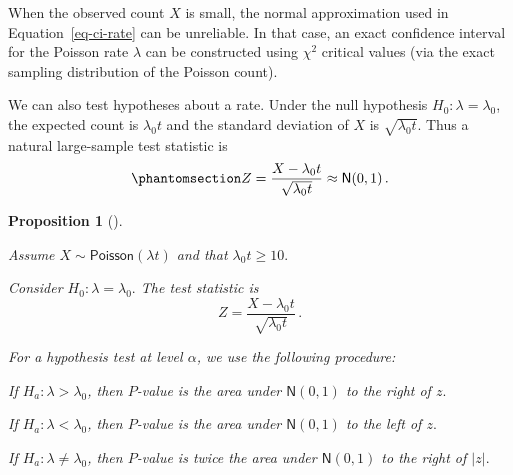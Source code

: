 \documentclass[
  a4paper,
  DIV=11,
  numbers=noendperiod,
  oneside]{scrreprt}
\theoremstyle{plain}
\theoremstyle{definition}
\theoremstyle{definition}
\theoremstyle{definition}
\theoremstyle{plain}
\newtheorem{proposition}{Proposition}[chapter]
\theoremstyle{remark}
\begin{document}
\begin{tcolorbox}[enhanced jigsaw, toprule=.15mm, colbacktitle=quarto-callout-note-color!10!white, breakable, toptitle=1mm, title=\textcolor{quarto-callout-note-color}{\faInfo}\hspace{0.5em}{Exact intervals for small counts}, left=2mm, leftrule=.75mm, colback=white, colframe=quarto-callout-note-color-frame, coltitle=black, opacitybacktitle=0.6, rightrule=.15mm, titlerule=0mm, bottomrule=.15mm, bottomtitle=1mm, arc=.35mm, opacityback=0]

When the observed count \(X\) is small, the normal approximation used in
Equation~\ref{eq-ci-rate} can be unreliable. In that case, an exact
confidence interval for the Poisson rate \(\lambda\) can be constructed
using \(\chi^2\) critical values (via the exact sampling distribution of
the Poisson count).

\end{tcolorbox}

We can also test hypotheses about a rate. Under the null hypothesis
\(H_0:\lambda=\lambda_0\), the expected count is \(\lambda_0 t\) and the
standard deviation of \(X\) is \(\sqrt{\lambda_0 t}\). Thus a natural
large-sample test statistic is
\begin{equation}\phantomsection\label{eq-htest-rate-z}{
Z = \frac{X - \lambda_0 t}{\sqrt{\lambda_0 t}} \approx \mathsf{N}(0,1)\,.
}\end{equation}

\begin{proposition}[]\protect\hypertarget{prp-htest-rate}{}\label{prp-htest-rate}

Assume \(X \sim \mathsf{Poisson}(\lambda t)\) and that
\(\lambda_0 t \ge 10.\)

Consider \(H_0 : \lambda = \lambda_0.\) The test statistic is \[
 Z = \frac{X - \lambda_0 t}{\sqrt{\lambda_0 t}} \,.
\]

For a hypothesis test at level \(\alpha\), we use the following
procedure:

If \(H_a : \lambda > \lambda_0\), then \(P\)-value is the area under
\(\mathsf{N}(0,1)\) to the right of \(z.\)

If \(H_a : \lambda < \lambda_0\), then \(P\)-value is the area under
\(\mathsf{N}(0,1)\) to the left of \(z.\)

If \(H_a : \lambda \neq \lambda_0\), then \(P\)-value is twice the area
under \(\mathsf{N}(0,1)\) to the right of \(|z|.\)

\end{proposition}
\end{document}
